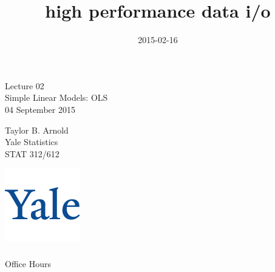 

\title{high performance data i/o}
\date{2015-02-16}



\begin{frame}[fragile] \frametitle{}

\vfill

{\fontsize{0.7cm}{0cm}\selectfont Lecture 02 \\\vspace{0.2cm} Simple Linear Models: OLS}\\\vspace{0.5cm}
04 September 2015

\vspace{2cm}

\begin{minipage}{0.6\textwidth}
Taylor B. Arnold \\
Yale Statistics \\
STAT 312/612
\end{minipage}
\hfill
\begin{minipage}{0.3\textwidth}\raggedleft
\includegraphics[scale=0.3]{../yale-logo.png}
\end{minipage}%

\end{frame}

\begin{frame}[fragile] \frametitle{}

\begin{flushright}
{\color{yaleblue}\sc\fontsize{1cm}{0cm}\selectfont Office Hours}
\end{flushright}

\end{frame}



